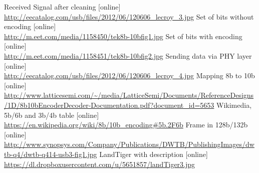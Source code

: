 \documentclass{BscUS}
\begin{document}
\begin{thebibliography}{1}
 Received Signal after cleaning [online]\\
\url{http://eecatalog.com/usb/files/2012/06/120606_lecroy_3.jpg}
 Set of bits without encoding [online] \\
\url{http://m.eet.com/media/1158450/tek8b-10bfig1.jpg}
 Set of bits with encoding [online] \\
\url{http://m.eet.com/media/1158451/tek8b-10bfig2.jpg}
 Sending data via PHY layer [online] \\
\url{http://eecatalog.com/usb/files/2012/06/120606_lecroy_4.jpg}
 Mapping 8b to 10b [online] \\
\url{http://www.latticesemi.com/~/media/LatticeSemi/Documents/ReferenceDesigns/1D/8b10bEncoderDecoder-Documentation.pdf?document_id=5653}
 Wikimedia, 5b/6b and 3b/4b table [online] \\
\url{https://en.wikipedia.org/wiki/8b/10b_encoding#5b.2F6b}
 Frame in 128b/132b [online] \\
\url{http://www.synopsys.com/Company/Publications/DWTB/PublishingImages/dwtb-q4/dwtb-q414-usb3-fig1.jpg}
 LandTiger with description [online] \\
\url{https://dl.dropboxusercontent.com/u/5651857/landTiger3.jpg}
\end{thebibliography}
\end{document}
